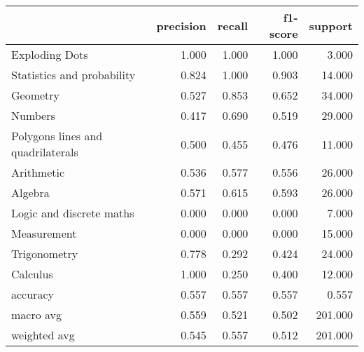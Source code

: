 \begin{tabular}{lrrrr}
\toprule
{} &  precision &  recall &  f1-score &  support \\
\midrule
Exploding Dots                    &      1.000 &   1.000 &     1.000 &    3.000 \\
Statistics and probability        &      0.824 &   1.000 &     0.903 &   14.000 \\
Geometry                          &      0.527 &   0.853 &     0.652 &   34.000 \\
Numbers                           &      0.417 &   0.690 &     0.519 &   29.000 \\
Polygons lines and quadrilaterals &      0.500 &   0.455 &     0.476 &   11.000 \\
Arithmetic                        &      0.536 &   0.577 &     0.556 &   26.000 \\
Algebra                           &      0.571 &   0.615 &     0.593 &   26.000 \\
Logic and discrete maths          &      0.000 &   0.000 &     0.000 &    7.000 \\
Measurement                       &      0.000 &   0.000 &     0.000 &   15.000 \\
Trigonometry                      &      0.778 &   0.292 &     0.424 &   24.000 \\
Calculus                          &      1.000 &   0.250 &     0.400 &   12.000 \\
accuracy                          &      0.557 &   0.557 &     0.557 &    0.557 \\
macro avg                         &      0.559 &   0.521 &     0.502 &  201.000 \\
weighted avg                      &      0.545 &   0.557 &     0.512 &  201.000 \\
\bottomrule
\end{tabular}
